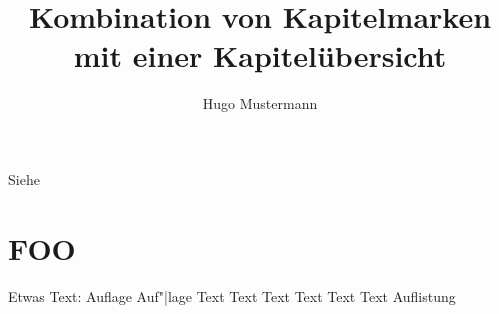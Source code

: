 \documentclass{dtk2}
\author{Hugo Mustermann}
\begin{document}
\title[Kurztitel 1]{Kombination von Kapitelmarken mit einer Kapitelübersicht}

\maketitle
\nocite{*}
Siehe~\cite{knuth:ct:a}

\section{FOO}

Etwas Text: Auflage Auf"|lage Text Text Text Text Text Text Auflistung

\clearpage

\printbibliography
\end{document}
